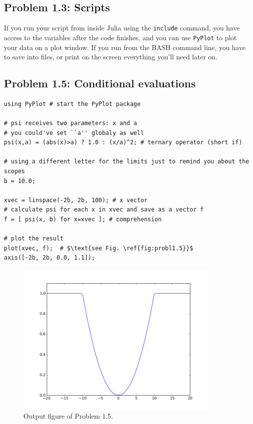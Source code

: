 \subsection*{Problem 1.3: Scripts}

If you run your script from inside Julia using the \texttt{include} command, you have access to the variables after the code finishes, and you can use \texttt{PyPlot} to plot your data on a plot window. If you run from the BASH command line, you have to save into files, or print on the screen everything you'll need later on. 

\subsection*{Problem 1.5: Conditional evaluations}

\begin{verbatim}
using PyPlot # start the PyPlot package

# psi receives two parameters: x and a
# you could've set ``a'' globaly as well
psi(x,a) = (abs(x)>a) ? 1.0 : (x/a)^2; # ternary operator (short if)

# using a different letter for the limits just to remind you about the scopes
b = 10.0; 

xvec = linspace(-2b, 2b, 100); # x vector
# calculate psi for each x in xvec and save as a vector f
f = [ psi(x, b) for x=xvec ]; # comprehension

# plot the result
plot(xvec, f);  # $\text{see Fig. \ref{fig:probl1.5}}$
axis([-2b, 2b, 0.0, 1.1]);
\end{verbatim}

\begin{figure}[ht!]
 \centering
 \includegraphics[width=10cm,keepaspectratio=true]{Prob-1-5.png}
 \caption{Output figure of Problem 1.5.}
 \label{fig:probl1.5}
\end{figure}

